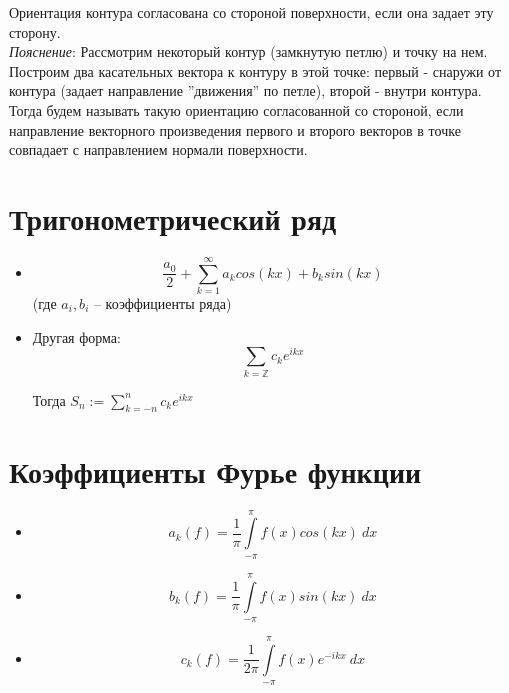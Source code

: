 \documentclass[paper=a4, fontsize=17pt]{article}
\begin{document}
	Ориентация контура согласована со стороной поверхности, если она задает эту сторону.\\
	
	\emph{Пояснение}: 
	Рассмотрим некоторый контур (замкнутую петлю) и точку на нем. Построим два касательных вектора к контуру в этой точке: первый - снаружи от контура (задает направление ''движения'' по петле), второй - внутри контура. Тогда будем называть такую ориентацию согласованной со стороной, если направление векторного произведения первого и второго векторов в точке совпадает с направлением нормали поверхности.
	
	\begin{center}
	\end{center}
	
	\section{Тригонометрический ряд}
	
	\begin{itemize}
		\item $$ \frac{a_0}{2}  + \sum_{k = 1}^{\infty} a_k cos(kx) + b_k sin(kx) $$ 
		(где $ a_i, b_i $ -- коэффициенты ряда)
		
		\item Другая форма:	$$ \sum_{k = \mathbb{Z}} c_k e^{ikx} $$
		
		Тогда $ S_n := \sum\limits_{k = -n}^{n} c_k e^{ikx} $
	\end{itemize}
	
	\section{Коэффициенты Фурье функции}
	
	\begin{itemize}
		\item $$ a_k(f) = \frac{1}{\pi} \int\limits_{-\pi}^{\pi} f(x) cos(kx) ~ dx $$
		
		\item $$ b_k(f) = \frac{1}{\pi} \int\limits_{-\pi}^{\pi} f(x) sin(kx) ~ dx $$
		
		\item $$ c_k(f) = \frac{1}{2\pi} \int\limits_{-\pi}^{\pi} f(x) e^{-ikx} ~ dx $$
		
	\end{itemize}
	
\end{document}
